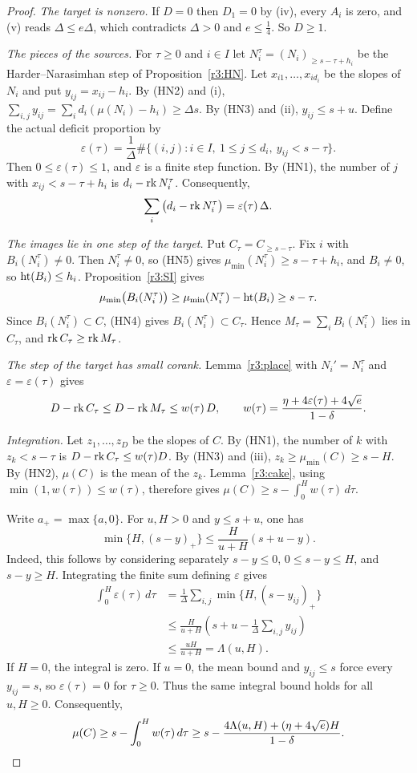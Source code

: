 \begin{proof}
\emph{The target is nonzero.} If $D=0$ then $D_1=0$ by (iv), every $A_i$ is zero, and (v) reads $\Delta\le e\Delta$, which contradicts $\Delta>0$ and $e\le\frac14$. So $D\ge1$.

\emph{The pieces of the sources.}
For $\tau\ge0$ and $i\in I$ let
$N_i^\tau=(N_i)_{\ge s-\tau+h_i}$ be the
Harder--Narasimhan step of Proposition~\ref{r3:HN}.
Let $x_{i1},\dots,x_{id_i}$ be the slopes of $N_i$
and put $y_{ij}=x_{ij}-h_i$.
By (HN2) and (i),
$\sum_{i,j}y_{ij}=\sum_id_i(\mu(N_i)-h_i)\ge\Delta s$.
By (HN3) and (ii), $y_{ij}\le s+u$.
Define the actual deficit proportion by
\[
\varepsilon(\tau)=\frac1\Delta
\#\{(i,j):i\in I,\ 1\le j\le d_i,\ y_{ij}<s-\tau\}.
\]
Then $0\le\varepsilon(\tau)\le1$, and
$\varepsilon$ is a finite step function.
By (HN1), the number of $j$ with
$x_{ij}<s-\tau+h_i$ is $d_i-\operatorname{rk} N_i^\tau$.
Consequently,
\[
\sum_i\big(d_i-\operatorname{rk} N_i^\tau\big)
=\varepsilon(\tau)\,\Delta.
\]

\emph{The images lie in one step of the target.} Put $C_\tau=C_{\ge s-\tau}$. Fix $i$ with $B_i(N_i^\tau)\ne0$. Then $N_i^\tau\ne0$, so (HN5) gives $\mu_{\min}(N_i^\tau)\ge s-\tau+h_i$, and $B_i\ne0$, so $\operatorname{ht}(B_i)\le h_i$. Proposition~\ref{r3:SI} gives
\[
\mu_{\min}\big(B_i(N_i^\tau)\big)\ge\mu_{\min}(N_i^\tau)-\operatorname{ht}(B_i)\ge s-\tau .
\]
Since $B_i(N_i^\tau)\subset C$, (HN4) gives $B_i(N_i^\tau)\subset C_\tau$. Hence $M_\tau=\sum_iB_i(N_i^\tau)$ lies in $C_\tau$, and $\operatorname{rk} C_\tau\ge\operatorname{rk} M_\tau$.

\emph{The step of the target has small corank.} Lemma~\ref{r3:place} with $N_i'=N_i^\tau$ and $\varepsilon=\varepsilon(\tau)$ gives
\[
D-\operatorname{rk} C_\tau\le D-\operatorname{rk} M_\tau\le w(\tau)\,D,\qquad w(\tau)=\frac{\eta+4\varepsilon(\tau)+4\sqrt e}{1-\delta}.
\]

\emph{Integration.}
Let $z_1,\dots,z_D$ be the slopes of $C$.
By (HN1), the number of $k$ with $z_k<s-\tau$ is
$D-\operatorname{rk} C_\tau\le w(\tau)D$.
By (HN3) and (iii),
$z_k\ge\mu_{\min}(C)\ge s-H$.
By (HN2), $\mu(C)$ is the mean of the $z_k$.
Lemma~\ref{r3:cake}, using $\min(1,w(\tau))\le w(\tau)$,
therefore gives
$\mu(C)\ge s-\int_0^H w(\tau)\,d\tau$.

Write $a_+=\max\{a,0\}$.
For $u,H>0$ and $y\le s+u$, one has
\[
\min\{H,(s-y)_+\}
\le\frac{H}{u+H}(s+u-y).
\]
Indeed, this follows by considering separately
$s-y\le0$, $0\le s-y\le H$, and $s-y\ge H$.
Integrating the finite sum defining $\varepsilon$ gives
\[
\begin{aligned}
\int_0^H\varepsilon(\tau)\,d\tau
&=\frac1\Delta\sum_{i,j}\min\{H,(s-y_{ij})_+\}\\
&\le\frac{H}{u+H}
\left(s+u-\frac1\Delta\sum_{i,j}y_{ij}\right)\\
&\le\frac{uH}{u+H}
=\Lambda(u,H).
\end{aligned}
\]
If $H=0$, the integral is zero.
If $u=0$, the mean bound and $y_{ij}\le s$ force
every $y_{ij}=s$, so $\varepsilon(\tau)=0$ for
$\tau\ge0$.
Thus the same integral bound holds for all $u,H\ge0$.
Consequently,
\[
\mu(C)\ge s-\int_0^H w(\tau)\,d\tau
\ge s-\frac{4\Lambda(u,H)+(\eta+4\sqrt e)H}{1-\delta}.
\qedhere
\]
\end{proof}

